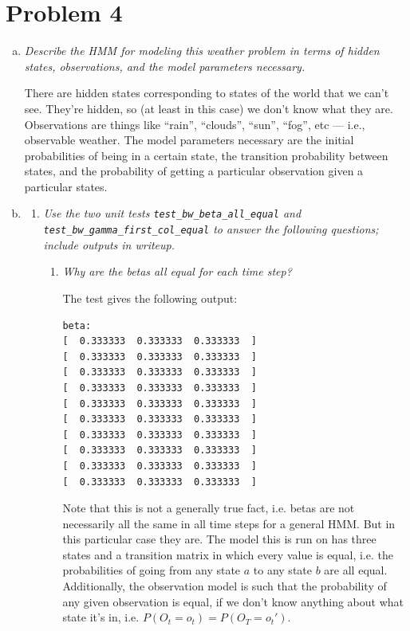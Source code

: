 \documentclass{article}
\begin{document}
\section*{Problem 4}
\begin{enumerate}[(a)]
\item \emph{Describe the HMM for modeling this weather problem in terms of hidden
  states, observations, and the model parameters necessary.}

  There are hidden states corresponding to states of the world that we
  can't see. They're hidden, so (at least in this case) we don't know
  what they are.  Observations are things like ``rain'', ``clouds'',
  ``sun'', ``fog'', etc --- i.e., observable weather.  The model
  parameters necessary are the initial probabilities of being in a
  certain state, the transition probability between states, and the
  probability of getting a particular observation given a particular
  states.

\item
  \begin{enumerate}
    \setcounter{enumii}2
  \item \emph{Use the two unit tests \emph{\texttt{test\_bw\_beta\_all\_equal}}
    and
    \emph{\texttt{test\_bw\_gamma\_first\_col\_equal}} to answer the following questions;
    include outputs in writeup.}

    \begin{enumerate}[(1)]
    \item \emph{Why are the betas all equal for each time step?}

      The test gives the following output:
\begin{verbatim}
beta:
[  0.333333  0.333333  0.333333  ]
[  0.333333  0.333333  0.333333  ]
[  0.333333  0.333333  0.333333  ]
[  0.333333  0.333333  0.333333  ]
[  0.333333  0.333333  0.333333  ]
[  0.333333  0.333333  0.333333  ]
[  0.333333  0.333333  0.333333  ]
[  0.333333  0.333333  0.333333  ]
[  0.333333  0.333333  0.333333  ]
[  0.333333  0.333333  0.333333  ]
\end{verbatim}

      Note that this is not a generally true fact, i.e. betas are not
      necessarily all the same in all time steps for a general HMM.  But
      in this particular case they are. The model this is run on has
      three states and a transition matrix in which every value is
      equal, i.e. the probabilities of going from any state $a$ to any
      state $b$ are all equal.  Additionally, the observation model is
      such that the probability of any given observation is equal, if we
      don't know anything about what state it's in,
      i.e. $P(O_t=o_t)=P(O_T=o_t')$.


\end{enumerate}
\end{enumerate}
\end{enumerate}
\end{document}
